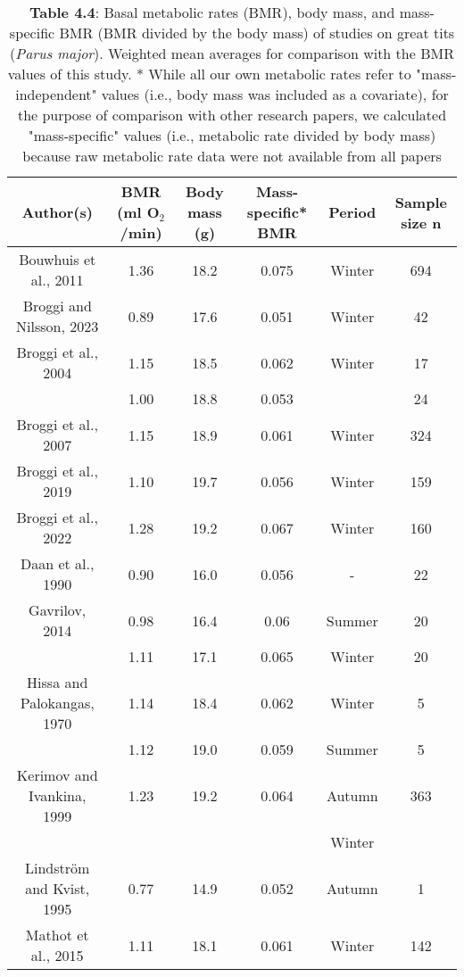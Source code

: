 \documentclass[10pt, twoside]{book} %
\begin{document}
\begin{table}[!ht]
    \centering
\caption*{\textbf{Table 4.4}: Basal metabolic rates (BMR), body mass, and mass-specific BMR (BMR divided by the body mass) of studies on great tits (\textit{Parus major}). Weighted mean averages for comparison with the BMR values of this study. * While all our own metabolic rates refer to "mass-independent" values (i.e., body mass was included as a covariate), for the purpose of comparison with other research papers, we calculated "mass-specific" values (i.e., metabolic rate divided by body mass) because raw metabolic rate data were not available from all papers}
\begin{adjustbox}{max width=\textwidth}    
    \begin{tabular}{cccccc}
    \hline
        Author(s) & BMR (ml O$_{\text{2}}$/min) & Body mass (g) & Mass-specific* BMR & Period & Sample size n \\ \hline
        Bouwhuis et al., 2011 & 1.36 & 18.2 & 0.075 & Winter & 694 \\ 
        Broggi and Nilsson, 2023 & 0.89 & 17.6 & 0.051 & Winter & 42 \\ 
        Broggi et al., 2004 & 1.15 & 18.5 & 0.062 & Winter & 17 \\ 
        ~ & 1.00 & 18.8 & 0.053 & ~ & 24 \\ 
        Broggi et al., 2007 & 1.15 & 18.9 & 0.061 & Winter & 324 \\ 
        Broggi et al., 2019 & 1.10 & 19.7 & 0.056 & Winter & 159 \\ 
        Broggi et al., 2022 & 1.28 & 19.2 & 0.067 & Winter & 160 \\ 
        Daan et al., 1990 & 0.90 & 16.0 & 0.056 & - & 22 \\ 
        Gavrilov, 2014 & 0.98 & 16.4 & 0.06 & Summer & 20 \\ 
        ~ & 1.11 & 17.1 & 0.065 & Winter & 20 \\ 
        Hissa and Palokangas, 1970 & 1.14 & 18.4 & 0.062 & Winter & 5 \\ 
        ~ & 1.12 & 19.0 & 0.059 & Summer & 5 \\ 
        Kerimov and Ivankina, 1999 & 1.23 & 19.2 & 0.064 & Autumn & 363 \\ 
        ~ & ~ & ~ & ~ & Winter & ~ \\ 
        Lindström and Kvist, 1995 & 0.77 & 14.9 & 0.052 & Autumn & 1 \\ 
        Mathot et al., 2015 & 1.11 & 18.1 & 0.061 & Winter & 142 \\ 

\end{tabular}
\end{adjustbox}
\end{table}
\end{document}
